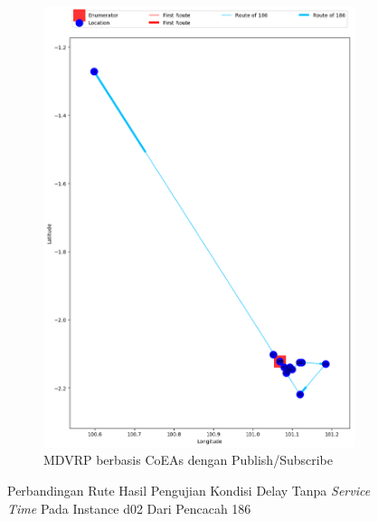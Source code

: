 \begin{figure}[H]\ContinuedFloat
	\centering
	\begin{subfigure}[t]{\textwidth}
		\centering
		\includegraphics[width=\textwidth]{Resources/Images/delayed_2/real_m15_n100_delayed_2_186_pubsub_coes}
		\caption{MDVRP berbasis CoEAs dengan Publish/Subscribe}
		\label{fig:real_m15_n100_delayed_2_186_pubsub_coes}
	\end{subfigure}
	\caption{Perbandingan Rute Hasil Pengujian Kondisi Delay Tanpa \textit{Service Time} Pada Instance d02 Dari Pencacah 186}
	\label{fig:real_m15_n100_delayed_2_186_contd}
\end{figure}


